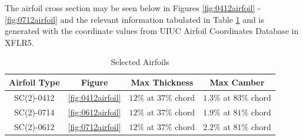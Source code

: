 The airfoil cross section may be seen below in Figures \ref{fig:0412airfoil} - \ref{fig:0712airfoil} and the relevant information tabulated in Table \ref{tab:airfoils} and is generated with the coordinate values from UIUC Airfoil Coordinates Database \cite{selig} in XFLR5.

\begin{table}[!h]
    \centering
    \caption{Selected Airfoils}
    \begin{tabular}{|c|c|c|c|} \toprule
        \textbf{Airfoil Type} & \textbf{Figure} & \textbf{Max Thickness} & \textbf{Max Camber}\\ \hline \hline
        SC(2)-0412 & \ref{fig:0412airfoil} & $12\%$ at $37\%$ chord & $1.3\%$ at $83\%$ chord \\ \hline
        SC(2)-0714 & \ref{fig:0612airfoil} & $12\%$ at $37\%$ chord & $1.9\%$ at $81\%$ chord \\ \hline
        SC(2)-0612 & \ref{fig:0712airfoil} & $12\%$ at $37\%$ chord & $2.2\%$ at $81\%$ chord \\ \bottomrule
    \end{tabular}
    \label{tab:airfoils}
\end{table}

